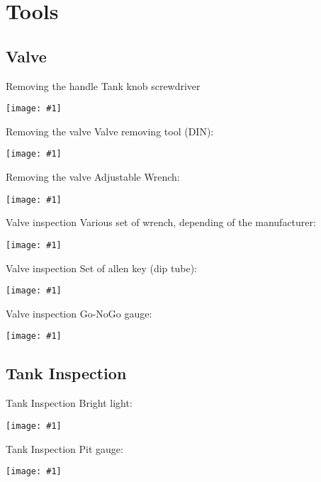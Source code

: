 \documentclass[aspectratio=1610,english,12pt]{beamer}
\newcommand{\vipict}[1]{%
	\hfill
	\begin{center}
		\texttt{[image: \#1]}
	\end{center}
	\hfill 
}
\begin{document}
\section{Tools}

\subsection{Valve}
\begin{frame}{Removing the handle}  
	Tank knob screwdriver\\
		\vipict{../img/knob_driver}
\end{frame}

\begin{frame}{Removing the valve}  
	Valve removing tool (DIN):\\
	\vipict{../img/din_removal} 
\end{frame}

\begin{frame}{Removing the valve}
	Adjustable Wrench:\\
	\vipict{../img/adj_wrench}
\end{frame}

\begin{frame}{Valve inspection}
	Various set of wrench, depending of the manufacturer:\\
	\vipict{../img/wrench}	
\end{frame}

\begin{frame}{Valve inspection}  
	Set of allen key (dip tube):\\
	\vipict{../img/allen}
\end{frame}

\begin{frame}{Valve inspection}  
	Go-NoGo gauge:\\
	\vipict{../img/valve_nogo}
\end{frame}

\subsection{Tank Inspection}
\begin{frame}{Tank Inspection}  
	Bright light:\\
	\vipict{../img/light}
\end{frame}

\begin{frame}{Tank Inspection}  
	Pit gauge:\\
	\vipict{../img/pit_probe}	
\end{frame}
\end{document}
